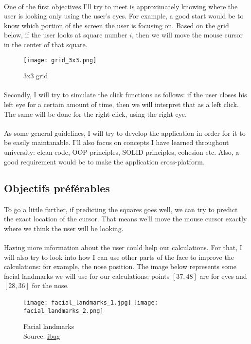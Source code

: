 \paragraph{}
One of the first objectives I'll try to meet is approximately knowing where the user is looking only using the user's eyes.
For example, a good start would be to know which portion of the screen the user is focusing on.
Based on the grid below, if the user looks at square number $i$, then we will move the mouse cursor in the center of that square.
\begin{figure}[H]
    \centering
    \texttt{[image: grid\_3x3.png]}
    \caption{3x3 grid}
\end{figure}

\paragraph{}
Secondly, I will try to simulate the click functions as follows: if the user closes his left eye for a certain amount of time, then we will interpret that as a left click.
The same will be done for the right click, using the right eye.

\paragraph{}
As some general guidelines, I will try to develop the application in order for it to be easily maintanable.
I'll also focus on concepts I have learned throughout university: clean code, OOP principles, SOLID principles, cohesion etc.
Also, a good requirement would be to make the application cross-platform.

\subsection{Objectifs préférables}
\paragraph{}
To go a little further, if predicting the squares goes well, we can try to predict the exact location of the cursor.
That means we'll move the mouse cursor exactly where we think the user will be looking.

\paragraph{}
Having more information about the user could help our calculations.
For that, I will also try to look into how I can use other parts of the face to improve the calculations: for example, the nose position.
The image below represents some facial landmarks we will use for our calculations: points $[37, 48]$ are for eyes and $[28, 36]$ for the nose.
\begin{figure}[H]
    \centering
    \texttt{[image: facial\_landmarks\_1.jpg]}
    \texttt{[image: facial\_landmarks\_2.png]}
    
    \caption{Facial landmarks\\Source: \href{https://ibug.doc.ic.ac.uk/resources/300-W/}{ibug}}
    \label{}
\end{figure}